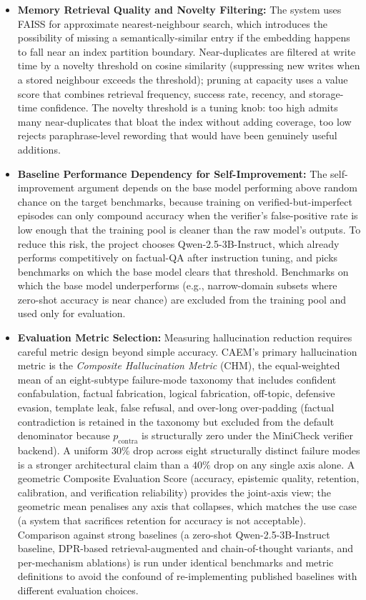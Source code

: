 \begin{itemize}
    \item \textbf{Memory Retrieval Quality and Novelty Filtering:} The system uses FAISS for approximate nearest-neighbour search, which introduces the possibility of missing a semantically-similar entry if the embedding happens to fall near an index partition boundary. Near-duplicates are filtered at write time by a novelty threshold on cosine similarity (suppressing new writes when a stored neighbour exceeds the threshold); pruning at capacity uses a value score that combines retrieval frequency, success rate, recency, and storage-time confidence. The novelty threshold is a tuning knob: too high admits many near-duplicates that bloat the index without adding coverage, too low rejects paraphrase-level rewording that would have been genuinely useful additions.

    \item \textbf{Baseline Performance Dependency for Self-Improvement:} The self-improvement argument depends on the base model performing above random chance on the target benchmarks, because training on verified-but-imperfect episodes can only compound accuracy when the verifier's false-positive rate is low enough that the training pool is cleaner than the raw model's outputs. To reduce this risk, the project chooses Qwen-2.5-3B-Instruct, which already performs competitively on factual-QA after instruction tuning, and picks benchmarks on which the base model clears that threshold. Benchmarks on which the base model underperforms (e.g., narrow-domain subsets where zero-shot accuracy is near chance) are excluded from the training pool and used only for evaluation.

    \item \textbf{Evaluation Metric Selection:} Measuring hallucination reduction requires careful metric design beyond simple accuracy. CAEM's primary hallucination metric is the \emph{Composite Hallucination Metric} (CHM), the equal-weighted mean of an eight-subtype failure-mode taxonomy that includes confident confabulation, factual fabrication, logical fabrication, off-topic, defensive evasion, template leak, false refusal, and over-long over-padding (factual contradiction is retained in the taxonomy but excluded from the default denominator because $p_{\text{contra}}$ is structurally zero under the MiniCheck verifier backend). A uniform $30\%$ drop across eight structurally distinct failure modes is a stronger architectural claim than a $40\%$ drop on any single axis alone. A geometric Composite Evaluation Score (accuracy, epistemic quality, retention, calibration, and verification reliability) provides the joint-axis view; the geometric mean penalises any axis that collapses, which matches the use case (a system that sacrifices retention for accuracy is not acceptable). Comparison against strong baselines (a zero-shot Qwen-2.5-3B-Instruct baseline, DPR-based retrieval-augmented and chain-of-thought variants, and per-mechanism ablations) is run under identical benchmarks and metric definitions to avoid the confound of re-implementing published baselines with different evaluation choices.
\end{itemize}

